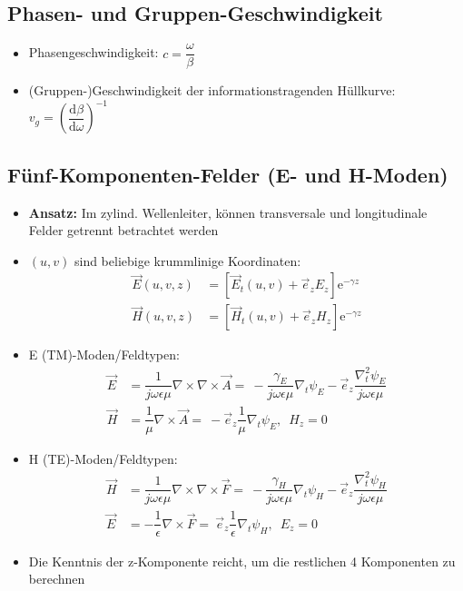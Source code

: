 \subsection{Phasen- und Gruppen-Geschwindigkeit}
\begin{itemize}
    \itemsep0pt
    \item Phasengeschwindigkeit: \(c = \dfrac{\omega}{\beta}\)
    \item (Gruppen-)Geschwindigkeit der informationstragenden Hüllkurve:\\
        \(v_g = \left( \dfrac{\mathrm{d}\beta}{\mathrm{d}\omega} \right)^{-1}\)
\end{itemize}
\subsection{Fünf-Komponenten-Felder (E- und H-Moden)}
\begin{itemize}
    \itemsep0pt
    \item \textbf{Ansatz:} Im zylind. Wellenleiter, können transversale und longitudinale Felder getrennt betrachtet werden
    \item \((u,v)\) sind beliebige krummlinige Koordinaten:
        \begin{align*}
            \vec{E}(u, v, z) &= \left[ \vec{E}_t(u,v) + \vec{e}_z E_z \right]\mathrm{e}^{-\gamma z}\\
            \vec{H}(u, v, z) &= \left[ \vec{H}_t(u,v) + \vec{e}_z H_z \right]\mathrm{e}^{-\gamma z}
        \end{align*}
    \item E (TM)-Moden/Feldtypen:
        \begin{align*}
            \vec{E} &= \dfrac{1}{j\omega\epsilon\mu} \nabla\times\nabla\times\vec{A} =\
            -\dfrac{\gamma_E}{j\omega\epsilon\mu}\nabla_t \psi_E - \vec{e}_z \dfrac{\nabla_t^2\psi_E}{j\omega\epsilon\mu}\\
            \vec{H} &= \dfrac{1}{\mu} \nabla\times\vec{A} =\
            - \vec{e}_z \dfrac{1}{\mu}\nabla_t \psi_E,\;\
            H_z = 0
        \end{align*}
    \item H (TE)-Moden/Feldtypen:
        \begin{align*}
             \vec{H} &= \dfrac{1}{j\omega\epsilon\mu} \nabla\times\nabla\times\vec{F} =\
            -\dfrac{\gamma_H}{j\omega\epsilon\mu}\nabla_t \psi_H - \vec{e}_z \dfrac{\nabla_t^2\psi_H}{j\omega\epsilon\mu}\\
            \vec{E} &= -\dfrac{1}{\epsilon} \nabla\times\vec{F} =\
            \vec{e}_z \dfrac{1}{\epsilon}\nabla_t \psi_H,\;\
            E_z = 0
        \end{align*}
    \item Die Kenntnis der z-Komponente reicht, um die restlichen 4 Komponenten zu berechnen
\end{itemize}
